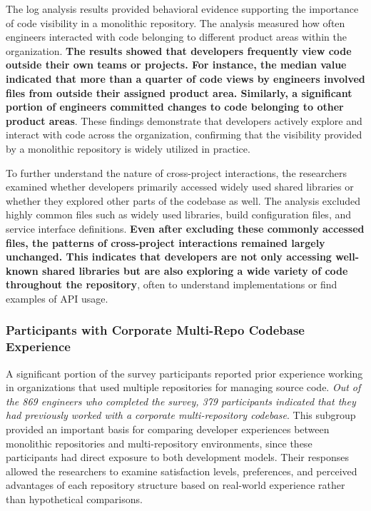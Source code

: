 The log analysis results provided behavioral evidence supporting the importance of code visibility in a monolithic repository. The analysis measured how often engineers interacted with code belonging to different product areas within the organization. \textbf{The results showed that developers frequently view code outside their own teams or projects. For instance, the median value indicated that more than a quarter of code views by engineers involved files from outside their assigned product area. Similarly, a significant portion of engineers committed changes to code belonging to other product areas}. These findings demonstrate that developers actively explore and interact with code across the organization, confirming that the visibility provided by a monolithic repository is widely utilized in practice.

To further understand the nature of cross-project interactions, the researchers examined whether developers primarily accessed widely used shared libraries or whether they explored other parts of the codebase as well. The analysis excluded highly common files such as widely used libraries, build configuration files, and service interface definitions. \textbf{Even after excluding these commonly accessed files, the patterns of cross-project interactions remained largely unchanged. This indicates that developers are not only accessing well-known shared libraries but are also exploring a wide variety of code throughout the repository}, often to understand implementations or find examples of API usage.

\subsubsection{Participants with Corporate Multi-Repo Codebase Experience}

A significant portion of the survey participants reported prior experience working in organizations that used multiple repositories for managing source code. \textit{Out of the 869 engineers who completed the survey, 379 participants indicated that they had previously worked with a corporate multi-repository codebase}. This subgroup provided an important basis for comparing developer experiences between monolithic repositories and multi-repository environments, since these participants had direct exposure to both development models. Their responses allowed the researchers to examine satisfaction levels, preferences, and perceived advantages of each repository structure based on real-world experience rather than hypothetical comparisons.

